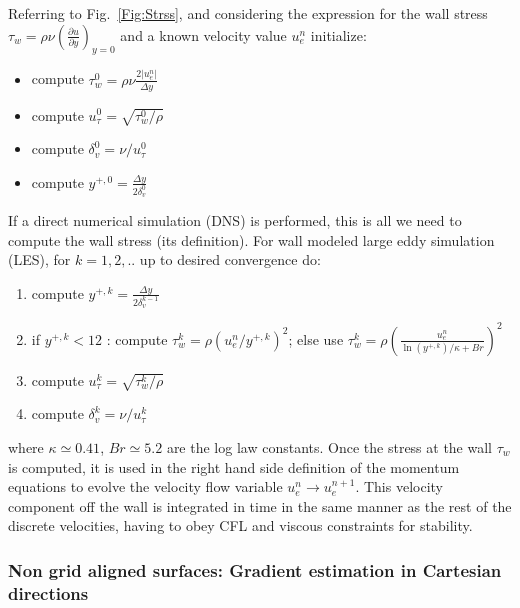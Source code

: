 Referring to Fig.~\ref{Fig:Strss}, and considering the expression for the wall stress $\tau_w = \rho \nu \left( \frac{\partial u}{\partial y} \right)_{y=0}$ and a known velocity value $u_e^n$ initialize:
%
\begin{itemize}
   \item compute $\tau_w^0 = \rho \nu \frac{2 |u_e^n|}{\Delta y}$
   \item compute $u_\tau^0 = \sqrt{\tau_w^0/\rho}$
   \item compute $\delta_v^0 = \nu/u_\tau^0$
   \item compute $y^{+,0} = \frac{\Delta y}{2 \delta_v^0}$
\end{itemize}
%
If a direct numerical simulation (DNS) is performed, this is all we need to compute the wall stress (its definition). For wall modeled large eddy simulation (LES), for $k=1,2,..$ up to desired convergence do:
%
\begin{enumerate}
   \item compute $y^{+,k} = \frac{\Delta y}{2 \delta_v^{k-1}}$
   \item if $y^{+,k} < 12$ : compute $\tau_w^k = \rho \left( u_e^n / y^{+,k} \right)^2$; else use 
   $\tau_w^k =\rho \left( \frac{u_e^n}{\ln{(y^{+,k})}/\kappa + Br} \right)^2$
   \item compute $u_\tau^k = \sqrt{\tau_w^k/\rho}$
   \item compute $\delta_v^k = \nu/u_\tau^k$
\end{enumerate}
%
where  $\kappa \simeq 0.41$, $Br \simeq 5.2$ are the log law constants. Once the stress at the wall $\tau_w$ is computed, it is used in the right hand side definition of the momentum equations to evolve the velocity flow variable $u_e^n \rightarrow u_e^{n+1}$. This velocity component
off the wall is integrated in time in the same manner as the rest of the discrete velocities, having to obey CFL and viscous constraints for stability.

\subsubsection{Non grid aligned surfaces: Gradient estimation in Cartesian directions}

